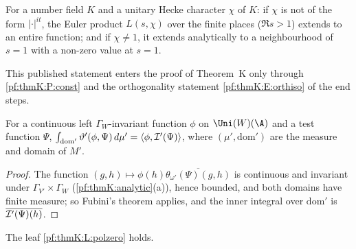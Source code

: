 \begin{littheorem}\label{pf:thmK:hecke}
For a number field $K$ and a unitary Hecke character $\chi$ of $K$: if $\chi$ is not of the form $|\cdot|^{it}$, the
Euler product $L(s,\chi)$ over the finite places ($\Re s>1$) extends to an entire function; and if $\chi\ne1$, it extends
analytically to a neighbourhood of $s=1$ with a non-zero value at $s=1$.
\end{littheorem}

This published statement enters the proof of Theorem~K only through \ref{pf:thmK:P:const} and the orthogonality
statement \ref{pf:thmK:E:orthiso} of the end steps.

\begin{lemma}\label{pf:thmK:fubini}
For a continuous left $\Gamma_W$-invariant function $\phi$ on $\Uni(W)(\A)$ and a test function $\Psi$,
$\int_{\mathrm{dom}'}\vartheta'(\phi,\Psi)\,d\mu'=\langle\phi,\mathcal{I}'(\Psi)\rangle$, where $(\mu',\mathrm{dom}')$ are the
measure and domain of $M'$.
\end{lemma}

\begin{proof}
The function $(g,h)\mapsto\phi(h)\overline{\theta_{\omega'}(\Psi)(g,h)}$ is continuous and invariant under $\Gamma_{V'}\times
\Gamma_W$ (\cref{pf:thmK:analytic}(a)), hence bounded, and both domains have finite measure; so Fubini's theorem applies, and
the inner integral over $\mathrm{dom}'$ is $\overline{\mathcal{I}'(\Psi)(h)}$.
\end{proof}

\begin{proposition}\label{pf:thmK:polzeroprop}
The leaf \ref{pf:thmK:L:polzero} holds.
\end{proposition}

